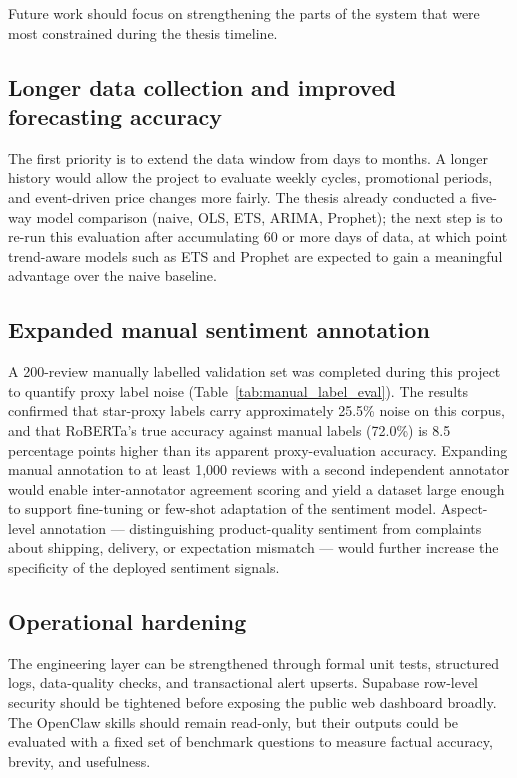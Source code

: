 Future work should focus on strengthening the parts of the system that were most constrained during the thesis timeline.

\subsection{Longer data collection and improved forecasting accuracy}

The first priority is to extend the data window from days to months. A longer history would allow the project to evaluate weekly cycles, promotional periods, and event-driven price changes more fairly. The thesis already conducted a five-way model comparison (naive, OLS, ETS, ARIMA, Prophet); the next step is to re-run this evaluation after accumulating 60 or more days of data, at which point trend-aware models such as ETS and Prophet are expected to gain a meaningful advantage over the naive baseline.

\subsection{Expanded manual sentiment annotation}

A 200-review manually labelled validation set was completed during this project to quantify proxy label noise (Table~\ref{tab:manual_label_eval}). The results confirmed that star-proxy labels carry approximately 25.5\% noise on this corpus, and that RoBERTa's true accuracy against manual labels (72.0\%) is 8.5 percentage points higher than its apparent proxy-evaluation accuracy. Expanding manual annotation to at least 1,000 reviews with a second independent annotator would enable inter-annotator agreement scoring and yield a dataset large enough to support fine-tuning or few-shot adaptation of the sentiment model. Aspect-level annotation --- distinguishing product-quality sentiment from complaints about shipping, delivery, or expectation mismatch --- would further increase the specificity of the deployed sentiment signals.

\subsection{Operational hardening}

The engineering layer can be strengthened through formal unit tests, structured logs, data-quality checks, and transactional alert upserts. Supabase row-level security should be tightened before exposing the public web dashboard broadly. The OpenClaw skills should remain read-only, but their outputs could be evaluated with a fixed set of benchmark questions to measure factual accuracy, brevity, and usefulness.

